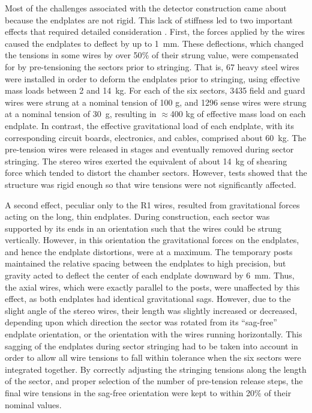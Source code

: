 Most of the challenges associated with the detector construction came about because 
the endplates are not rigid.  This lack of stiffness led to two important effects 
that required detailed consideration \cite{rat}.  First, the forces applied by the 
wires caused the endplates to deflect by up to 1~mm.  These deflections, which 
changed the tensions in some wires by over 50$\%$ of their strung value, were 
compensated for by pre-tensioning the sectors prior to stringing.  That is, 67 heavy 
steel wires were installed in order to deform the endplates prior to stringing, 
using effective mass loads between 2 and 14~kg.  For each of the six sectors, 3435 
field and guard wires were strung at a nominal tension of 100 g, and 1296 sense 
wires were strung at a nominal tension of 30~g, resulting in $\approx$400 kg of 
effective mass load on each endplate.  In contrast, the effective gravitational 
load of each endplate, with its corresponding circuit boards, electronics, and cables, 
comprised about 60~kg.  The pre-tension wires were released in stages and eventually 
removed during sector stringing.  The stereo wires exerted the equivalent of 
about 14~kg of shearing force which tended to distort the chamber sectors. However, 
tests showed that the structure was rigid enough so that wire tensions were 
not significantly affected.

A second effect, peculiar only to the R1 wires, resulted from gravitational 
forces acting on the long, thin endplates.  During construction, each sector was 
supported by its ends in an orientation such that the wires could be strung 
vertically.  However, in this orientation the gravitational forces on the
endplates, and hence the endplate distortions, were at a maximum.  The temporary 
posts maintained the relative spacing between the endplates to high precision, but 
gravity acted to deflect the center of each endplate downward by 6~mm.  Thus, the 
axial wires, which were exactly parallel to the posts, were unaffected by this effect, 
as both endplates had identical gravitational sags.  However, due to the slight angle 
of the stereo wires, their length was slightly increased or decreased, depending upon 
which direction the sector was rotated from its ``sag-free'' endplate orientation, or 
the orientation with the wires running horizontally.  This sagging of the endplates 
during sector stringing had to be taken into account in order to allow all wire tensions 
to fall within tolerance when the six sectors were integrated together.  By correctly 
adjusting the stringing tensions along the length of the sector, and proper selection 
of the number of pre-tension release steps, the final wire tensions in the sag-free 
orientation were kept to within 20$\%$ of their nominal values.









